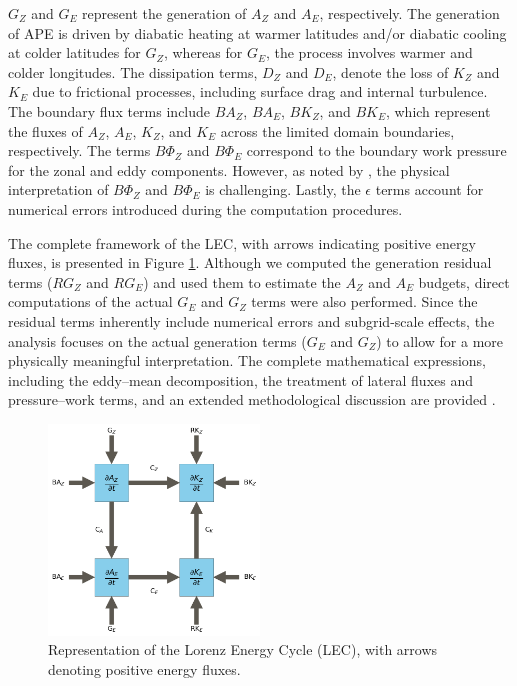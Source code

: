 \documentclass[pdflatex,sn-chicago]{sn-jnl}%
\theoremstyle{plain}
\theoremstyle{definition}
\theoremstyle{remark}
\theoremstyle{definition}
\begin{document}
\(G_Z\) and \(G_E\) represent the generation of \(A_Z\) and \(A_E\), respectively. The generation of APE is driven by diabatic heating at warmer latitudes and/or diabatic cooling at colder latitudes for \(G_Z\), whereas for \(G_E\), the process involves warmer and colder longitudes. The dissipation terms, \(D_Z\) and \(D_E\), denote the loss of \(K_Z\) and \(K_E\) due to frictional processes, including surface drag and internal turbulence. The boundary flux terms include \(BA_Z\), \(BA_E\), \(BK_Z\), and \(BK_E\), which represent the fluxes of \(A_Z\), \(A_E\), \(K_Z\), and \(K_E\) across the limited domain boundaries, respectively. The terms \(B\Phi_Z\) and \(B\Phi_E\) correspond to the boundary work pressure for the zonal and eddy components. However, as noted by \citet{muench1965dynamics}, the physical interpretation of \(B\Phi_Z\) and \(B\Phi_E\) is challenging. Lastly, the \(\epsilon\) terms account for numerical errors introduced during the computation procedures. 

The complete framework of the LEC, with arrows indicating positive energy fluxes, is presented in Figure \ref{fig:LEC_example}. Although we computed the generation residual terms ($RG_Z$ and $RG_E$) and used them to estimate the $A_Z$ and $A_E$ budgets, direct computations of the actual $G_E$ and $G_Z$ terms were also performed. Since the residual terms inherently include numerical errors and subgrid-scale effects, the analysis focuses on the actual generation terms ($G_E$ and $G_Z$) to allow for a more physically meaningful interpretation. The complete mathematical expressions, including the eddy–mean decomposition, the treatment of lateral fluxes and pressure–work terms, and an extended methodological discussion are provided \citep{de2025lorenz}. 


\begin{figure}[h!]
\centering
\includegraphics[width=0.5\textwidth]{LEC_chains.png}
\caption{Representation of the Lorenz Energy Cycle (LEC), with arrows denoting positive energy fluxes.}
\label{fig:LEC_example}
\end{figure}
\end{document}
